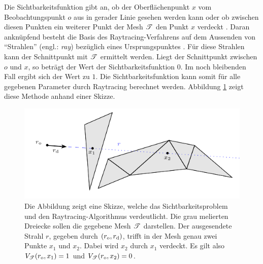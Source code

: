 		Die Sichtbarkeitsfunktion gibt an, ob der Oberflächenpunkt $x$ vom Beobachtungspunkt $o$ aus in gerader Linie gesehen werden kann oder ob zwischen diesen Punkten ein weiterer Punkt der Mesh $\mathscr{T}$ den Punkt $x$ verdeckt \cite[S.~30]{3d-visibility}.
		Daran anknüpfend besteht die Basis des Raytracing-Verfahrens auf dem Aussenden von \enquote{Strahlen} (engl.: \textit{ray}) bezüglich eines Ursprungspunktes \cite{pbrt3,parker-ray-tracing,nikodym-ray-tracing}.
		Für diese Strahlen kann der Schnittpunkt mit $\mathscr{T}$ ermittelt werden.
		Liegt der Schnittpunkt zwischen $o$ und $x$, so beträgt der Wert der Sichtbarkeitsfunktion $0$.
		Im noch bleibenden Fall ergibt sich der Wert zu $1$.
		Die Sichtbarkeitsfunktion kann somit für alle gegebenen Parameter durch Raytracing berechnet werden.
		Abbildung \ref{fig:ray_tracing-1} zeigt diese Methode anhand einer Skizze.

		\begin{figure}[h]
			\center
			\includegraphics{gg_fig/ray_tracing_1.pdf}
			\caption[Skizze des Sichtbarkeitsproblems und des Raytracing-Verfahrens]{Die Abbildung zeigt eine Skizze, welche das Sichtbarkeitsproblem und den Raytracing-Algorithmus verdeutlicht. Die grau melierten Dreiecke sollen die gegebene Mesh $\mathscr{T}$ darstellen. Der ausgesendete Strahl $r$, gegeben durch $(r_{\mathrm{o}},r_{\mathrm{d}})$, trifft in der Mesh genau zwei Punkte $x_1$ und $x_2$. Dabei wird $x_2$ durch $x_1$ verdeckt. Es gilt also $V_{\mathscr{T}}(r_{\mathrm{o}},x_1)=1$ und $V_{\mathscr{T}}(r_{\mathrm{o}},x_2)=0$.}
			\label{fig:ray_tracing-1}
		\end{figure}



